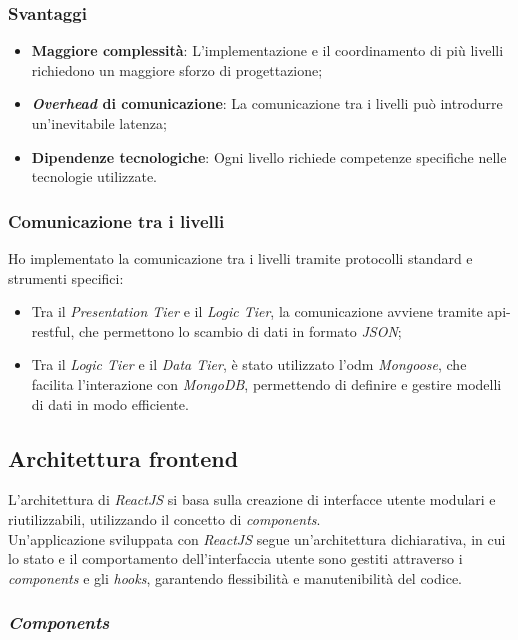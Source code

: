 \subsubsection{Svantaggi}
\begin{itemize}
    \item \textbf{Maggiore complessità}: L'implementazione e il coordinamento di più livelli richiedono un maggiore sforzo di progettazione;
    \item \textbf{\textit{Overhead} di comunicazione}: La comunicazione tra i livelli può introdurre un'inevitabile latenza;
    \item \textbf{Dipendenze tecnologiche}: Ogni livello richiede competenze specifiche nelle tecnologie utilizzate.
\end{itemize}

\subsubsection{Comunicazione tra i livelli}

\noindent Ho implementato la comunicazione tra i livelli tramite protocolli standard e strumenti specifici:
\begin{itemize}
    \item Tra il \textit{Presentation Tier} e il \textit{Logic Tier}, la comunicazione avviene tramite \gls{api-restful}, che permettono lo scambio di dati in formato \textit{JSON};
    \item Tra il \textit{Logic Tier} e il \textit{Data Tier}, è stato utilizzato l'\gls{odm} \textit{Mongoose}, che facilita l'interazione con \textit{MongoDB}, permettendo di definire e gestire modelli di dati in modo efficiente.
\end{itemize}

\subsection*{Architettura frontend}

L'architettura di \textit{ReactJS} si basa sulla creazione di interfacce utente modulari e riutilizzabili, utilizzando il concetto di \textit{components}. \\
Un'applicazione sviluppata con \textit{ReactJS} segue un'architettura dichiarativa, in cui lo stato e il comportamento dell'interfaccia utente sono gestiti attraverso i \textit{components} e gli \textit{hooks}, garantendo flessibilità e manutenibilità del codice.

\subsubsection{\textit{Components}}

